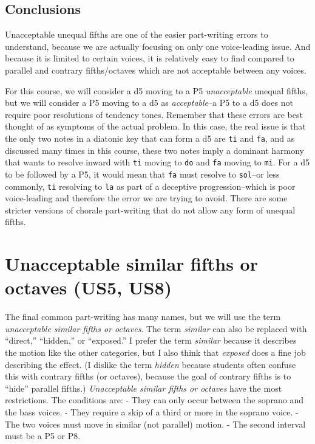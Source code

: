 \documentclass{book}
\begin{document}
\hypertarget{conclusions-45}{%
\subsection{Conclusions}\label{conclusions-45}}

Unacceptable unequal fifths are one of the easier part-writing errors to
understand, because we are actually focusing on only one voice-leading issue.
And because it is limited to certain voices, it is relatively easy to find
compared to parallel and contrary fifths/octaves which are not acceptable
between any voices.

For this course, we will consider a d5 moving to a P5 \emph{unacceptable}
unequal fifths, but we will consider a P5 moving to a d5 as
\emph{acceptable}--a P5 to a d5 does not require poor resolutions of tendency
tones. Remember that these errors are best thought of as symptoms of the
actual problem. In this case, the real issue is that the only two notes in a
diatonic key that can form a d5 are \texttt{ti} and \texttt{fa}, and as
discussed many times in this course, these two notes imply a dominant harmony
that wants to resolve inward with \texttt{ti} moving to \texttt{do} and
\texttt{fa} moving to \texttt{mi}. For a d5 to be followed by a P5, it would
mean that \texttt{fa} must resolve to \texttt{sol}--or less commonly,
\texttt{ti} resolving to \texttt{la} as part of a deceptive progression--which
is poor voice-leading and therefore the error we are trying to avoid. There
are some stricter versions of chorale part-writing that do not allow any form
of unequal fifths.

\hypertarget{unacceptable-similar-fifths-or-octaves-us5-us8}{%
\section{Unacceptable similar fifths or octaves (US5,
US8)}\label{unacceptable-similar-fifths-or-octaves-us5-us8}}

The final common part-writing has many names, but we will use the term
\emph{unacceptable similar fifths or octaves}. The term \emph{similar} can
also be replaced with ``direct,'' ``hidden,'' or ``exposed.'' I prefer the
term \emph{similar} because it describes the motion like the other categories,
but I also think that \emph{exposed} does a fine job describing the effect. (I
dislike the term \emph{hidden} because students often confuse this with
contrary fifths (or octaves), because the goal of contrary fifths is to
``hide'' parallel fifths.) \emph{Unacceptable similar fifths or octaves} have
the most restrictions. The conditions are: - They can only occur between the
soprano and the bass voices. - They require a skip of a third or more in the
soprano voice. - The two voices must move in similar (not parallel) motion. -
The second interval must be a P5 or P8.
\end{document}
